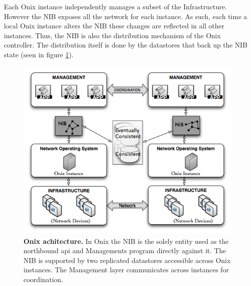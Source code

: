 \begin{itemize}
Each Onix instance  independently manages a subset of the
Infrastructure. However the NIB  exposes all the network for each
instance. As such, each time a local Onix instance alters the NIB these
changes are reflected in all other instances. Thus, the NIB is also
the distribution mechanism of the Onix controller. The  distribution
itself is done by the datastores that back up  the NIB state (seen
in figure \ref{fig:onix-design}).

\begin{figure}
  \centering 
  \includegraphics[scale=0.5]{pic/onix-design.png}
  \caption[Onix architecture] {\textbf{Onix achitecture.} In Onix the NIB is the
    solely entity used as the northbound api and Managements program
    directly against it. The NIB is supported by
    two replicated datastores accessible across Onix instances.  The
    Management layer communicates across instances for coordination.}
  \label{fig:onix-design}
\end{figure}


\end{itemize}
